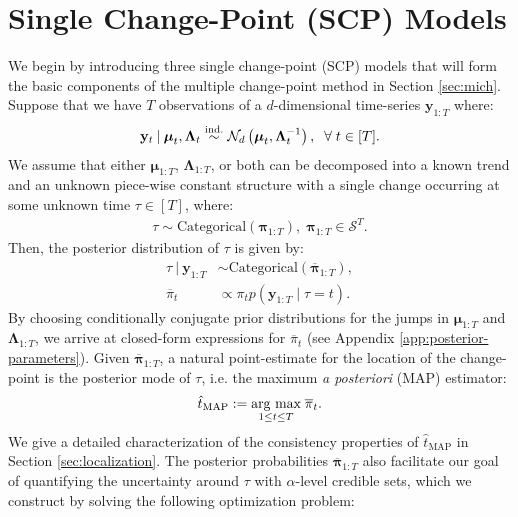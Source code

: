 \section{Single Change-Point (SCP) Models}
\label{sec:scp}

We begin by introducing three single change-point (SCP) models that will form the basic components of the multiple change-point method in Section \ref{sec:mich}. Suppose that we have $T$ observations of a $d$-dimensional time-series $\mathbf{y}_{1:T}$ where:
\begin{align}\label{eq:dgp}
    \mathbf{y}_t \:|\: \boldsymbol{\mu}_t, \boldsymbol{\Lambda}_t \overset{\text{ind.}}{\sim} \mathcal{N}_d\left(\boldsymbol{\mu}_t, \boldsymbol{\Lambda}^{-1}_t\right), \;\;\forall\; t \in [T].
\end{align}
We assume that either $\boldsymbol{\mu}_{1:T}$, $\boldsymbol{\Lambda}_{1:T}$, or both can be decomposed into a known trend and an unknown piece-wise constant structure with a single change occurring at some unknown time $\tau \in [T]$, where:
\begin{align}
    \tau \sim \text{Categorical}(\boldsymbol{\pi}_{1:T}), \; \boldsymbol{\pi}_{1:T} \in \mathcal{S}^T. \label{eq:tau-cat}
\end{align}
Then, the posterior distribution of $\tau$ is given by:
\begin{align}
    \tau \:|\: \mathbf{y}_{1:T} &\sim \text{Categorical}(\overline{\boldsymbol{\pi}}_{1:T}), \label{eq:gamma-post-cat1} \\ 
    \overline{\pi}_t &\propto  \pi_t p(\mathbf{y}_{1:T} \;|\; \tau = t). \label{eq:gamma-post-cat2}
\end{align}
By choosing conditionally conjugate prior distributions for the jumps in $\boldsymbol{\mu}_{1:T}$ and $\boldsymbol{\Lambda}_{1:T}$, we arrive at closed-form expressions for $\overline{\pi}_t$ (see Appendix \ref{app:posterior-parameters}). Given $\overline{\boldsymbol{\pi}}_{1:T}$, a natural point-estimate for the location of the change-point is the posterior mode of $\tau$, i.e. the maximum \textit{a posteriori} (MAP) estimator:
\begin{align}\label{eq:map}
    \hat{t}_{\text{MAP}} := \underset{1 \leq t \leq T}{\text{\normalfont arg max}} \; \overline{\pi}_t.
\end{align}
We give a detailed characterization of the consistency properties of $\hat{t}_{\text{MAP}}$ in Section \ref{sec:localization}. The posterior probabilities $\overline{\boldsymbol{\pi}}_{1:T}$ also facilitate our goal of quantifying the uncertainty around $\tau$ with $\alpha$-level credible sets, which we construct by solving the following optimization problem:
